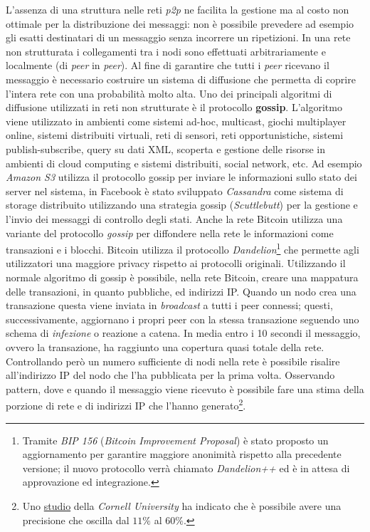 L'assenza di una struttura nelle reti \textit{p2p} ne facilita la gestione ma al costo non ottimale per la distribuzione dei messaggi: non è possibile prevedere ad esempio gli esatti destinatari di un messaggio senza incorrere un ripetizioni.\newline
In una rete non strutturata i collegamenti tra i nodi sono effettuati arbitrariamente e localmente (di \textit{peer} in \textit{peer}).\newline
Al fine di garantire che tutti i \textit{peer} ricevano il messaggio è necessario costruire un sistema di diffusione che permetta di coprire l'intera rete con una probabilità molto alta. Uno dei principali algoritmi di diffusione utilizzati in reti non strutturate è il protocollo \textbf{gossip}.
L'algoritmo viene utilizzato in ambienti come sistemi ad-hoc, multicast, giochi multiplayer online, sistemi distribuiti virtuali, reti di sensori, reti opportunistiche, sistemi publish-subscribe, query su dati XML, scoperta e gestione delle risorse in ambienti di cloud computing e sistemi distribuiti, social network, etc. Ad esempio \textit{Amazon S3} utilizza il protocollo gossip per inviare le informazioni sullo stato dei server nel sistema, in Facebook è stato sviluppato \textit{Cassandra} come sistema di storage distribuito utilizzando una strategia gossip (\textit{Scuttlebutt}) per la gestione e l'invio dei messaggi di controllo degli stati.\newline
Anche la rete Bitcoin utilizza una variante del protocollo \textit{gossip} per diffondere nella rete le informazioni come transazioni e i blocchi. Bitcoin utilizza il protocollo \textit{Dandelion}\footnote{Tramite \textit{BIP 156} (\textit{Bitcoin Improvement Proposal}) è stato proposto un aggiornamento per garantire maggiore anonimità rispetto alla precedente versione; il nuovo protocollo verrà chiamato \textit{Dandelion++} ed è in attesa di approvazione ed integrazione.} che permette agli utilizzatori una maggiore privacy rispetto ai protocolli originali. Utilizzando il normale algoritmo di gossip è possibile, nella rete Bitcoin, creare una mappatura delle transazioni, in quanto pubbliche, ed indirizzi IP. Quando un nodo crea una transazione questa viene inviata in \textit{broadcast} a tutti i peer connessi; questi, successivamente, aggiornano i propri peer con la stessa transazione seguendo uno schema di \textit{infezione} o reazione a catena. In media entro i 10 secondi il messaggio, ovvero la transazione, ha raggiunto una copertura quasi totale della rete.
Controllando però un numero sufficiente di nodi nella rete è possibile risalire all'indirizzo IP del nodo che l'ha pubblicata per la prima volta. Osservando pattern, dove e quando il messaggio viene ricevuto è possibile fare una stima della porzione di rete e di indirizzi IP che l'hanno generato\footnote{Uno \href{https://arxiv.org/abs/1405.7418}{studio} della \textit{Cornell University} ha indicato che è possibile avere una precisione che oscilla dal $11\%$ al $60\%$.}.\newline
